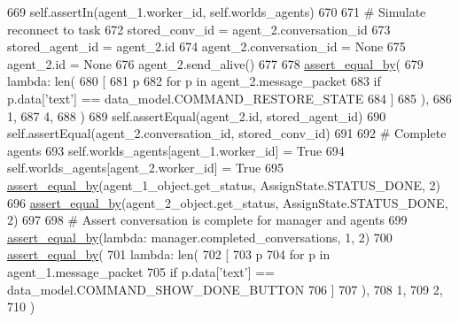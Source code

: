 \begin{DoxyCode}
669         self.assertIn(agent\_1.worker\_id, self.worlds\_agents)
670 
671         \textcolor{comment}{# Simulate reconnect to task}
672         stored\_conv\_id = agent\_2.conversation\_id
673         stored\_agent\_id = agent\_2.id
674         agent\_2.conversation\_id = \textcolor{keywordtype}{None}
675         agent\_2.id = \textcolor{keywordtype}{None}
676         agent\_2.send\_alive()
677 
678         \hyperlink{namespaceparlai_1_1mturk_1_1core_1_1test_1_1test__full__system_a0b463246d35658a2e422010f13dcf819}{assert\_equal\_by}(
679             \textcolor{keyword}{lambda}: len(
680                 [
681                     p
682                     \textcolor{keywordflow}{for} p \textcolor{keywordflow}{in} agent\_2.message\_packet
683                     \textcolor{keywordflow}{if} p.data[\textcolor{stringliteral}{'text'}] == data\_model.COMMAND\_RESTORE\_STATE
684                 ]
685             ),
686             1,
687             4,
688         )
689         self.assertEqual(agent\_2.id, stored\_agent\_id)
690         self.assertEqual(agent\_2.conversation\_id, stored\_conv\_id)
691 
692         \textcolor{comment}{# Complete agents}
693         self.worlds\_agents[agent\_1.worker\_id] = \textcolor{keyword}{True}
694         self.worlds\_agents[agent\_2.worker\_id] = \textcolor{keyword}{True}
695         \hyperlink{namespaceparlai_1_1mturk_1_1core_1_1test_1_1test__full__system_a0b463246d35658a2e422010f13dcf819}{assert\_equal\_by}(agent\_1\_object.get\_status, AssignState.STATUS\_DONE, 2)
696         \hyperlink{namespaceparlai_1_1mturk_1_1core_1_1test_1_1test__full__system_a0b463246d35658a2e422010f13dcf819}{assert\_equal\_by}(agent\_2\_object.get\_status, AssignState.STATUS\_DONE, 2)
697 
698         \textcolor{comment}{# Assert conversation is complete for manager and agents}
699         \hyperlink{namespaceparlai_1_1mturk_1_1core_1_1test_1_1test__full__system_a0b463246d35658a2e422010f13dcf819}{assert\_equal\_by}(\textcolor{keyword}{lambda}: manager.completed\_conversations, 1, 2)
700         \hyperlink{namespaceparlai_1_1mturk_1_1core_1_1test_1_1test__full__system_a0b463246d35658a2e422010f13dcf819}{assert\_equal\_by}(
701             \textcolor{keyword}{lambda}: len(
702                 [
703                     p
704                     \textcolor{keywordflow}{for} p \textcolor{keywordflow}{in} agent\_1.message\_packet
705                     \textcolor{keywordflow}{if} p.data[\textcolor{stringliteral}{'text'}] == data\_model.COMMAND\_SHOW\_DONE\_BUTTON
706                 ]
707             ),
708             1,
709             2,
710         )

\end{DoxyCode}

